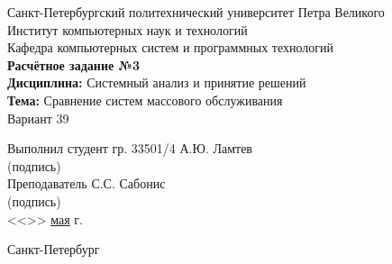 \begin{titlepage}
\begin{center}
	Санкт-Петербургский политехнический университет Петра Великого\\[0.3cm]
	Институт компьютерных наук и технологий \\[0.3cm]
	Кафедра компьютерных систем и программных технологий\\[4cm]
	
	\textbf{Расчётное задание №3}\\[2mm]
	\textbf{Дисциплина:} Системный анализ и принятие решений\\[2mm]
	\textbf{Тема:} Сравнение систем массового обслуживания\\[2mm]
	Вариант 39\\[6.5cm]
\end{center}

\begin{flushleft}
	\hspace*{5mm} Выполнил студент гр. 33501/4  \hspace*{3cm}\sign[3cm]\hspace*{2mm} А.Ю. Ламтев\\
	\hspace*{10.85cm} (подпись)\\[2.5mm]
	\hspace*{5mm} Преподаватель \hspace*{6.45cm}\sign[3cm]\hspace*{2mm} С.С. Сабонис\\
	\hspace*{10.85cm} (подпись)\\[2.5mm]
	\hspace*{11.1cm} <<\underline{\the\day}>> \underline{\hspace{5mm}мая\hspace{5mm}} \the\year\hspace{1mm} г.
\end{flushleft}

\vfill

\begin{center}
	Санкт-Петербург\\
	\the\year
\end{center}
\end{titlepage}
\addtocounter{page}{1}